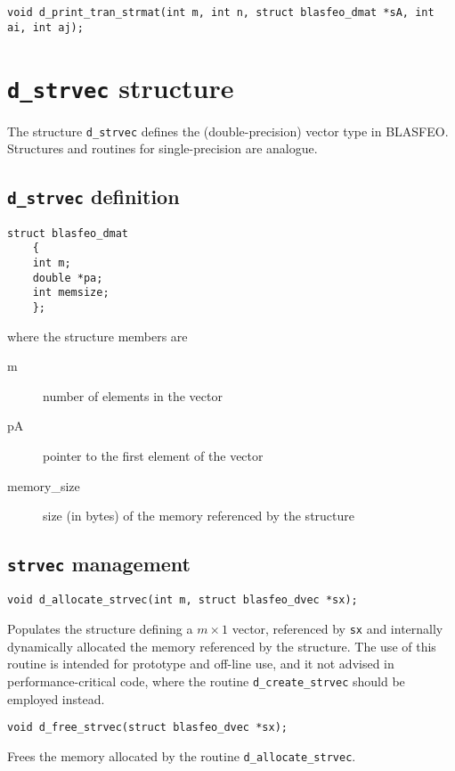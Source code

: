 \documentclass[a4paper]{report}
\begin{document}
\begin{verbatim}
void d_print_tran_strmat(int m, int n, struct blasfeo_dmat *sA, int ai, int aj);
\end{verbatim}



\section{{\tt d\_strvec} structure}

The structure {\tt d\_strvec} defines the (double-precision) vector type in BLASFEO.
Structures and routines for single-precision are analogue.



\subsection{{\tt d\_strvec} definition}

\begin{verbatim}
struct blasfeo_dmat 
    {
    int m;
    double *pa;
    int memsize;
    };
\end{verbatim}
where the structure members are
\begin{description}
\item[m] number of elements in the vector
\item[pA] pointer to the first element of the vector
\item[memory\_size] size (in bytes) of the memory referenced by the structure
\end{description}



\subsection{{\tt strvec} management}

\begin{verbatim}
void d_allocate_strvec(int m, struct blasfeo_dvec *sx);
\end{verbatim}
Populates the structure defining a $m\times 1$ vector, referenced by {\tt sx} and internally dynamically allocated the memory referenced by the structure.
The use of this routine is intended for prototype and off-line use, and it not advised in performance-critical code, where the routine {\tt d\_create\_strvec} should be employed instead.

\begin{verbatim}
void d_free_strvec(struct blasfeo_dvec *sx);
\end{verbatim}
Frees the memory allocated by the routine {\tt d\_allocate\_strvec}.
\end{document}
